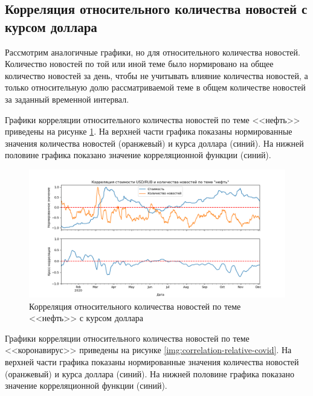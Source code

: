 \subsection{Корреляция относительного количества новостей с курсом доллара}

Рассмотрим аналогичные графики, но для относительного количества новостей. Количество новостей по той или иной теме было нормировано на общее количество новостей за день, чтобы не учитывать влияние количества новостей, а только относительную долю рассматриваемой теме в общем количестве новостей за заданный временной интервал.

Графики корреляции относительного количества новостей по теме <<нефть>> приведены на рисунке \ref{img:correlation-relative-oil}. На верхней части графика показаны нормированные значения количества новостей (оранжевый) и курса доллара (синий). На нижней половине графика показано значение корреляционной функции (синий).
\begin{figure}[h]
    \centering
    \includegraphics[width=\linewidth]{images/correlations/relative/нефть.png}
    \caption{Корреляция относительного количества новостей по теме <<нефть>> с курсом доллара}
    \label{img:correlation-relative-oil}
\end{figure}

Графики корреляции относительного количества новостей по теме <<коронавирус>> приведены на рисунке \ref{img:correlation-relative-covid}. На верхней части графика показаны нормированные значения количества новостей (оранжевый) и курса доллара (синий). На нижней половине графика показано значение корреляционной функции (синий).

